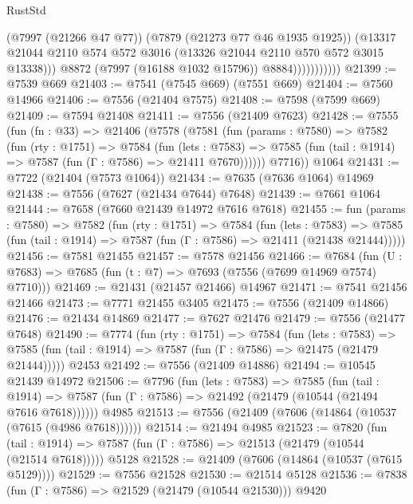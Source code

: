 \begin{lexlean}{RustStd}
\begin{coremodule}
                            (@7997 (@21266 @47 @77))
                            (@7879 (@21273 @77 @46 @1935 @1925))
                            (@13317
                              @21044
                              @2110
                              @574
                              @572
                              @3016
                              (@13326 @21044 @2110 @570 @572 @3015 @13338)))
                          @8872
                          (@7997 (@16188 @1032 @15796))
                          @8884)))))))))))
@21399 := @7539 @669
@21403 := @7541 (@7545 @669) (@7551 @669)
@21404 := @7560 @14966
@21406 := @7556 (@21404 @7575)
@21408 := @7598 (@7599 @669)
@21409 := @7594 @21408
@21411 := @7556 (@21409 @7623)
@21428 := @7555
    (fun (fn : @33) =>
    @21406
      (@7578
        (@7581
          (fun (params : @7580) =>
          @7582
            (fun (rty : @1751) =>
            @7584
              (fun (lets : @7583) =>
              @7585 (fun (tail : @1914) => @7587 (fun (Γ : @7586) => @21411 @7670))))))
        @7716))
    @1064
@21431 := @7722 (@21404 (@7573 @1064))
@21434 := @7635 (@7636 @1064) @14969
@21438 := @7556 (@7627 (@21434 @7644) @7648)
@21439 := @7661 @1064
@21444 := @7658 (@7660 @21439 @14972 @7616 @7618)
@21455 := fun (params : @7580) =>
  @7582
    (fun (rty : @1751) =>
    @7584
      (fun (lets : @7583) =>
      @7585 (fun (tail : @1914) => @7587 (fun (Γ : @7586) => @21411 (@21438 @21444)))))
@21456 := @7581 @21455
@21457 := @7578 @21456
@21466 := @7684
    (fun (U : @7683) => @7685 (fun (t : @7) => @7693 (@7556 (@7699 @14969 @7574) @7710)))
@21469 := @21431 (@21457 @21466) @14967
@21471 := @7541 @21456 @21466
@21473 := @7771 @21455 @3405
@21475 := @7556 (@21409 @14866)
@21476 := @21434 @14869
@21477 := @7627 @21476
@21479 := @7556 (@21477 @7648)
@21490 := @7774
    (fun (rty : @1751) =>
    @7584
      (fun (lets : @7583) =>
      @7585 (fun (tail : @1914) => @7587 (fun (Γ : @7586) => @21475 (@21479 @21444)))))
    @2453
@21492 := @7556 (@21409 @14886)
@21494 := @10545 @21439 @14972
@21506 := @7796
    (fun (lets : @7583) =>
    @7585
      (fun (tail : @1914) =>
      @7587 (fun (Γ : @7586) => @21492 (@21479 (@10544 (@21494 @7616 @7618))))))
    @4985
@21513 := @7556 (@21409 (@7606 (@14864 (@10537 (@7615 (@4986 @7618))))))
@21514 := @21494 @4985
@21523 := @7820
    (fun (tail : @1914) => @7587 (fun (Γ : @7586) => @21513 (@21479 (@10544 (@21514 @7618)))))
    @5128
@21528 := @21409 (@7606 (@14864 (@10537 (@7615 @5129))))
@21529 := @7556 @21528
@21530 := @21514 @5128
@21536 := @7838 (fun (Γ : @7586) => @21529 (@21479 (@10544 @21530))) @9420

\end{coremodule}
\end{lexlean}

